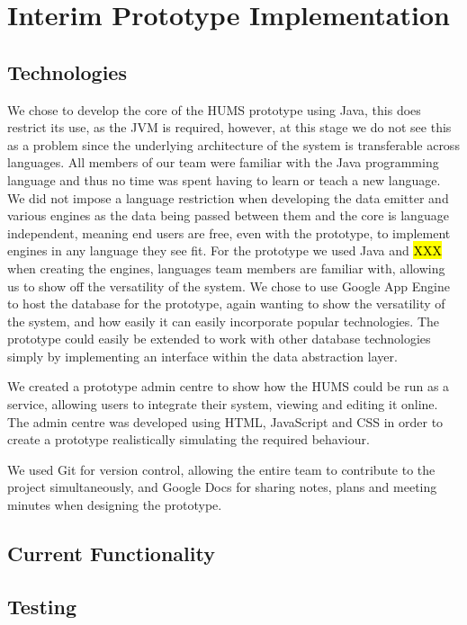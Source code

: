 \documentclass[10pt,a4paper]{article}
\begin{document}

\section{Interim Prototype Implementation}

\subsection{Technologies}
We chose to develop the core of the HUMS prototype using Java, this does restrict its use, as the JVM is required, however, at this stage we do not see this as a problem since the underlying architecture of the system is transferable across languages.
All members of our team were familiar with the Java programming language and thus no time was spent having to learn or teach a new language. 
We did not impose a language restriction when developing the data emitter and various engines as the data being passed between them and the core is language independent, meaning end users are free, even with the prototype, to implement engines in any language they see fit. For the prototype we used Java and \hl{XXX} when creating the engines, languages team members are familiar with, allowing us to show off the versatility of the system.
We chose to use Google App Engine to host the database for the prototype, again wanting to show the versatility of the system, and how easily it can easily incorporate popular technologies. The prototype could easily be extended to work with other database technologies simply by implementing an interface within the data abstraction layer.

We created a prototype admin centre to show how the HUMS could be run as a service, allowing users to integrate their system, viewing and editing it online. The admin centre was developed using HTML, JavaScript and CSS in order to create a prototype realistically simulating the required behaviour.

We used Git for version control, allowing the entire team to contribute to the project simultaneously, and Google Docs for sharing notes, plans and meeting minutes when designing the prototype.
\subsection{Current Functionality}

\subsection{Testing}
\end{document}
